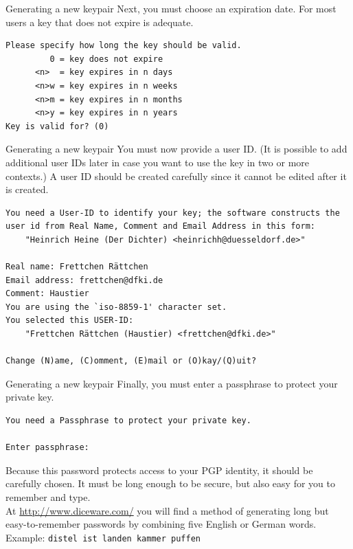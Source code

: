 \documentclass[%
mode=present,%
paper=smartboard,
size=20pt,
]{powerdot}
\begin{document}
\begin{slide}[method=direct,toc=]{Generating a new keypair}
  Next, you must choose an expiration date. For most users a key
  that does not expire is adequate.\\[1ex]
\begin{verbatim}
Please specify how long the key should be valid.
         0 = key does not expire
      <n>  = key expires in n days
      <n>w = key expires in n weeks
      <n>m = key expires in n months
      <n>y = key expires in n years
Key is valid for? (0)
\end{verbatim}
\end{slide}

\begin{slide}[method=direct,toc=]{Generating a new keypair}
  You must now provide a user ID.  (It is possible to add additional
  user IDs later in case you want to use the key in two or more
  contexts.) A user ID should be created carefully since it cannot be
  edited after it is created.\\[1ex]
\begin{verbatim}
You need a User-ID to identify your key; the software constructs the
user id from Real Name, Comment and Email Address in this form:
    "Heinrich Heine (Der Dichter) <heinrichh@duesseldorf.de>"

Real name: Frettchen Rättchen
Email address: frettchen@dfki.de
Comment: Haustier
You are using the `iso-8859-1' character set.
You selected this USER-ID:
    "Frettchen Rättchen (Haustier) <frettchen@dfki.de>"

Change (N)ame, (C)omment, (E)mail or (O)kay/(Q)uit?
\end{verbatim}
\end{slide}

\begin{slide}[method=direct,toc=]{Generating a new keypair}
Finally, you must enter a passphrase to protect your private key.\\[1ex]
\begin{verbatim}
You need a Passphrase to protect your private key.    

Enter passphrase: 

\end{verbatim}
Because this password protects access to your PGP identity, it should
be carefully chosen.  It must be long enough to be secure, but also
easy for you to remember and type.\\[1ex]

At \url{http://www.diceware.com/} you will find a method of generating
long but easy-to-remember passwords by combining five English or
German words.\\[1ex]

Example: \texttt{distel ist landen kammer puffen}
\end{slide}
\end{document}
